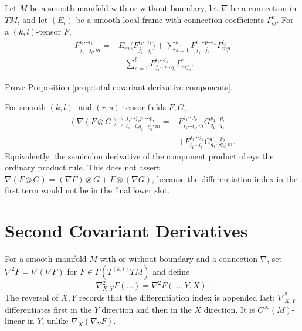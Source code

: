 \begin{proposition}
\label{prop:total-covariant-derivative-components}
Let $M$ be a smooth manifold with or without boundary, let $\nabla$ be a
connection in $TM$, and let $(E_i)$ be a smooth local frame with connection
coefficients $\Gamma^k_{ij}$. For a $(k,l)$-tensor $F$,
\[
\begin{aligned}
F^{i_1\cdots i_k}_{j_1\cdots j_l;m}
={}&E_m\bigl(F^{i_1\cdots i_k}_{j_1\cdots j_l}\bigr)
+\sum_{s=1}^kF^{i_1\cdots p\cdots i_k}_{j_1\cdots j_l}\Gamma^{i_s}_{mp}\\
&-\sum_{s=1}^lF^{i_1\cdots i_k}_{j_1\cdots p\cdots j_l}\Gamma^p_{mj_s}.
\end{aligned}
\]
\end{proposition}

\begin{exercise}
\label{exer:prove-proposition-4-18}
Prove Proposition \ref{prop:total-covariant-derivative-components}.
\end{exercise}

\begin{exercise}
\label{exer:tensor-product-covariant-derivative}
For smooth $(k,l)$- and $(r,s)$-tensor fields $F,G$,
\[
\begin{aligned}
(\nabla(F\otimes G))^{j_1\cdots j_kp_1\cdots p_r}_{i_1\cdots i_lq_1\cdots q_s;m}
={}&F^{j_1\cdots j_k}_{i_1\cdots i_l;m}G^{p_1\cdots p_r}_{q_1\cdots q_s}\\
&+F^{j_1\cdots j_k}_{i_1\cdots i_l}G^{p_1\cdots p_r}_{q_1\cdots q_s;m}.
\end{aligned}
\]
Equivalently, the semicolon derivative of the component product obeys the
ordinary product rule. This does not assert
$\nabla(F\otimes G)=(\nabla F)\otimes G+F\otimes(\nabla G)$, because the
differentiation index in the first term would not be in the final lower slot.
\end{exercise}

\section{Second Covariant Derivatives}

For a smooth manifold $M$ with or without boundary and a connection $\nabla$,
set $\nabla^2F=\nabla(\nabla F)$ for $F\in\Gamma(T^{(k,l)}TM)$ and define
\[
\nabla^2_{X,Y}F(\ldots)=\nabla^2F(\ldots,Y,X).
\]
The reversal of $X,Y$ records that the differentiation index is appended last;
$\nabla^2_{X,Y}$ differentiates first in the $Y$ direction and then in the
$X$ direction. It is $C^\infty(M)$-linear in $Y$, unlike
$\nabla_X(\nabla_YF)$.


